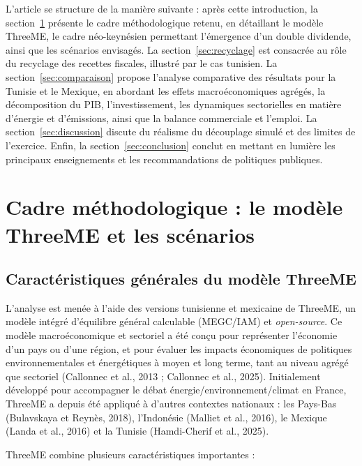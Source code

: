 \documentclass[12pt, a4paper]{article}
\begin{document}
L'article se structure de la manière suivante : après cette introduction, la section~\ref{sec:cadre} présente le cadre méthodologique retenu, en détaillant le modèle ThreeME, le cadre néo-keynésien permettant l'émergence d'un double dividende, ainsi que les scénarios envisagés. La section~\ref{sec:recyclage} est consacrée au rôle du recyclage des recettes fiscales, illustré par le cas tunisien. La section~\ref{sec:comparaison} propose l'analyse comparative des résultats pour la Tunisie et le Mexique, en abordant les effets macroéconomiques agrégés, la décomposition du PIB, l'investissement, les dynamiques sectorielles en matière d'énergie et d'émissions, ainsi que la balance commerciale et l'emploi. La section~\ref{sec:discussion} discute du réalisme du découplage simulé et des limites de l'exercice. Enfin, la section~\ref{sec:conclusion} conclut en mettant en lumière les principaux enseignements et les recommandations de politiques publiques.

\section{Cadre méthodologique : le modèle ThreeME et les scénarios}
\label{sec:cadre}

\subsection{Caractéristiques générales du modèle ThreeME}
\label{subsec:threeme}

L'analyse est menée à l'aide des versions tunisienne et mexicaine de ThreeME, un modèle intégré d'équilibre général calculable (MEGC/IAM) et \textit{open-source}. Ce modèle macroéconomique et sectoriel a été conçu pour représenter l'économie d'un pays ou d'une région, et pour évaluer les impacts économiques de politiques environnementales et énergétiques à moyen et long terme, tant au niveau agrégé que sectoriel (Callonnec et al., 2013 ; Callonnec et al., 2025). Initialement développé pour accompagner le débat énergie/environnement/climat en France, ThreeME a depuis été appliqué à d'autres contextes nationaux : les Pays-Bas (Bulavskaya et Reynès, 2018), l'Indonésie (Malliet et al., 2016), le Mexique (Landa et al., 2016) et la Tunisie (Hamdi-Cherif et al., 2025).

ThreeME combine plusieurs caractéristiques importantes :
\end{document}
